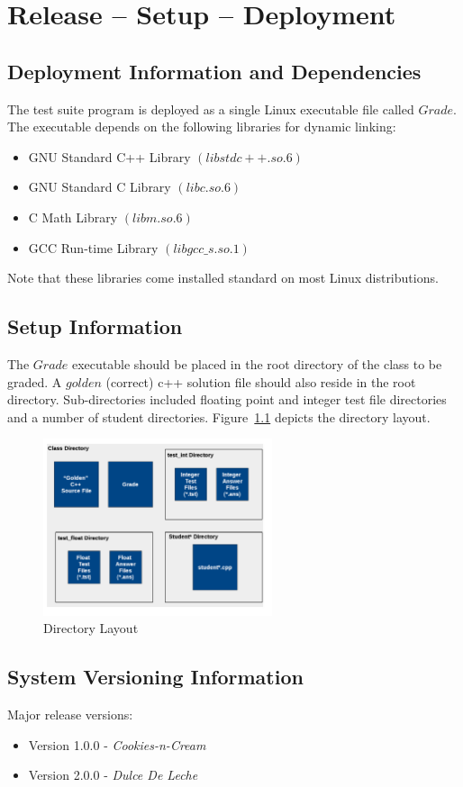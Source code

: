 
\chapter{Release -- Setup -- Deployment}

\section{Deployment Information and Dependencies}
The test suite program is deployed as a single Linux executable file called $Grade$. The executable depends on the following libraries for dynamic linking:

\begin{itemize}
	\item GNU Standard C++ Library $(libstdc++.so.6)$
	\item GNU Standard C Library $(libc.so.6)$
	\item C Math Library $(libm.so.6)$
	\item GCC Run-time Library $(libgcc\_s.so.1)$
\end{itemize}

\noindent Note that these libraries come installed standard on most Linux distributions.


\section{Setup Information}
The $Grade$ executable should be placed in the root directory of the class to be graded. A $golden$ (correct) c++ solution file should also reside in the root directory. Sub-directories included floating point and integer test file directories and a number of student directories.
Figure~\ref{directorylayout} depicts the directory layout.
\begin{figure}[H]
\begin{center}
\includegraphics[width=0.6\textwidth]{./directorylayout}
\end{center}
\caption{Directory Layout \label{directorylayout}}
\end{figure}


\section{System  Versioning Information}
Major release versions:
\begin{itemize}
	\item Version 1.0.0 - {\it Cookies-n-Cream}
	\item Version 2.0.0 - {\it Dulce De Leche}
\end{itemize}
